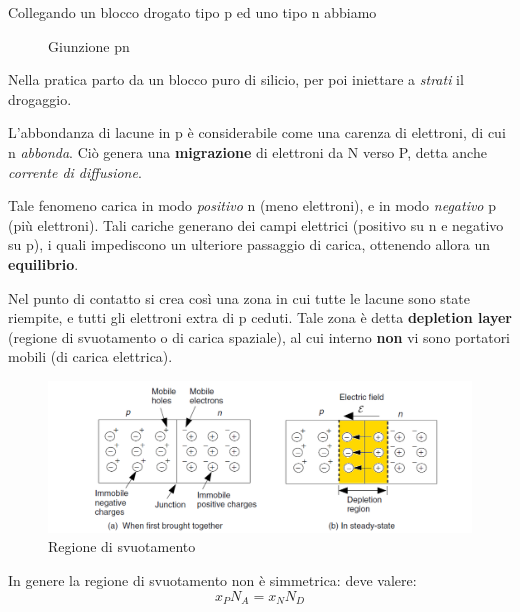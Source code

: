 \documentclass[
]{book}
\begin{document}
Collegando un blocco drogato tipo p ed uno tipo n abbiamo

\begin{figure}[H]
\centering
{}
\caption{Giunzione pn}
\end{figure}

Nella pratica parto da un blocco puro di silicio, per poi iniettare a
\emph{strati} il drogaggio.

L'abbondanza di lacune in p è considerabile come una carenza di
elettroni, di cui n \emph{abbonda}. Ciò genera una \textbf{migrazione}
di elettroni da N verso P, detta anche \emph{corrente di diffusione}.

Tale fenomeno carica in modo \emph{positivo} n (meno elettroni), e in
modo \emph{negativo} p (più elettroni). \newline Tali cariche generano
dei campi elettrici (positivo su n e negativo su p), i quali impediscono
un ulteriore passaggio di carica, ottenendo allora un
\textbf{equilibrio}.

Nel punto di contatto si crea così una zona in cui tutte le lacune sono
state riempite, e tutti gli elettroni extra di p ceduti. Tale zona è
detta \textbf{depletion layer} (regione di svuotamento o di carica
spaziale), al cui interno \textbf{non} vi sono portatori mobili (di
carica elettrica).

\begin{figure}
\centering
\includegraphics[width=0.8\linewidth,height=\textheight,keepaspectratio]{immagini/1.png}
\caption{Regione di svuotamento}
\end{figure}

In genere la regione di svuotamento non è simmetrica: deve valere: \[
x_P N_A = x_N N_D
\]
\end{document}

